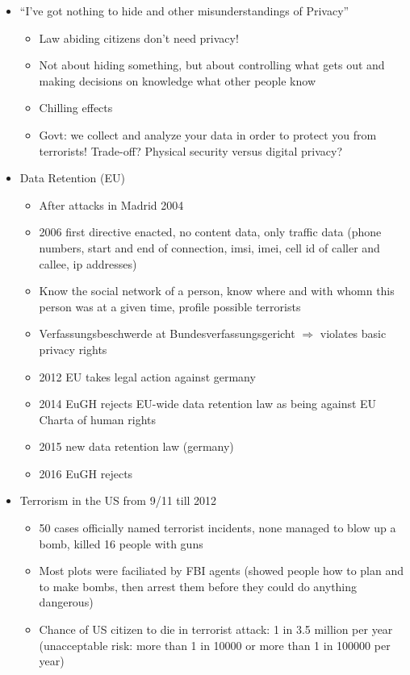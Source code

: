 \documentclass[a4paper,12pt]{scrartcl}
\begin{document}
\begin{itemize}
\begin{itemize}
		\end{itemize}
	\item
		\enquote{I've got nothing to hide and other misunderstandings of Privacy}
		\begin{itemize}
			\item
				Law abiding citizens don't need privacy!
			\item
				Not about hiding something, but about controlling what gets out and making decisions on knowledge what other people know
			\item
				Chilling effects
			\item
				Govt: we collect and analyze your data in order to protect you from terrorists! Trade-off? Physical security versus digital privacy?
		\end{itemize}
	\item
		Data Retention (EU)
		\begin{itemize}
			\item
				After attacks in Madrid 2004
			\item
				2006 first directive enacted, no content data, only traffic data (phone numbers, start and end of connection, imsi, imei, cell id of caller and callee, ip addresses)
			\item
				Know the social network of a person, know where and with whomn this person was at a given time, profile possible terrorists
			\item
				Verfassungsbeschwerde at Bundesverfassungsgericht $\Rightarrow$ violates basic privacy rights
			\item
				2012 EU takes legal action against germany
			\item
				2014 EuGH rejects EU-wide data retention law as being against EU Charta of human rights
			\item
				2015 new data retention law (germany)
			\item
				2016 EuGH rejects
		\end{itemize}
	\item
		Terrorism in the US from 9/11 till 2012
		\begin{itemize}
			\item
				50 cases officially named terrorist incidents, none managed to blow up a bomb, killed 16 people with guns
			\item
				Most plots were faciliated by FBI agents (showed people how to plan and to make bombs, then arrest them before they could do anything dangerous)
			\item
				Chance of US citizen to die in terrorist attack: 1 in 3.5 million per year (unacceptable risk: more than 1 in 10000 or more than 1 in 100000 per year)

\end{itemize}
\end{itemize}
\end{document}
